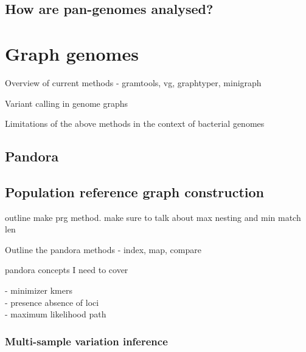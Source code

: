 \subsection{How are pan-genomes analysed?}



\section{Graph genomes}

Overview of current methods - gramtools, vg, graphtyper, minigraph

Variant calling in genome graphs

Limitations of the above methods in the context of bacterial genomes

\subsection{Pandora}
\label{sec:pandora-intro}

\subsection{Population reference graph construction}
\label{sec:make_prg}
outline make prg method. make sure to talk about max nesting and min match len

Outline the pandora methods - index, map, compare

pandora concepts I need to cover 

- minimizer kmers \\
- presence absence of loci \\
- maximum likelihood path

\cite{rachelthesis}

\subsubsection{Multi-sample variation inference}
\label{sec:pandora-compare}


